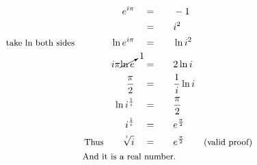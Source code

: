 \begin{alignat*}{5}
&\,&e^{i\pi}\quad&=\quad&&-1\\
&\,&\,&=&&i^2\\
&\small\text{take ln both sides}&\ln{e^{i\pi}}\quad&=&&\ln{i^2}\\
&\,&i\pi\cancelto{1}{\ln{e}}\quad&=&&2\ln{i}\\
&\,&\quad\frac{\pi}{2}\quad&=&&\frac{{1}}{i}\ln{i}\\
&\,&\quad\ln{i^\frac{1}{i}}\quad&=&&\frac{\pi}{2}\\
&\,&\quad i^\frac{1}{i}\quad&=&&e^\frac{\pi}{2}\\
&\,&\small\text{Thus}\normalsize\qquad\sqrt[^i]{i}\quad&=&&e^\frac{\pi}{2}\qquad\small\text{(valid proof)}\\
&\rlap{\qquad\qquad\qquad\qquad\small\text{And it is a real number.}}
\end{alignat*}
